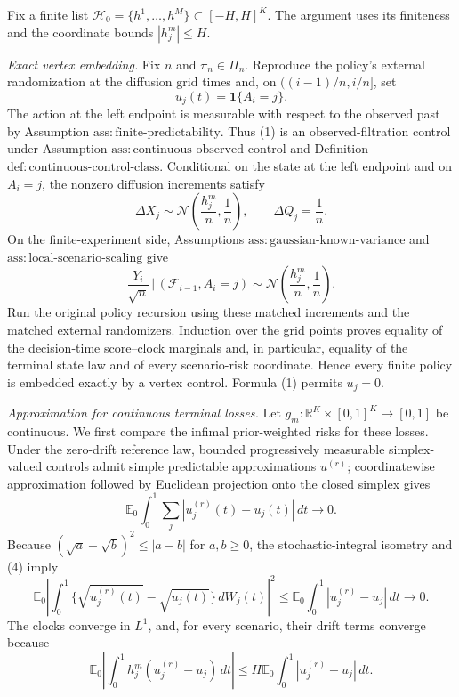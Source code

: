 Fix a finite list \(\mathcal H_0=\{h^1,\ldots,h^M\}\subset[-H,H]^K\).  The argument uses its finiteness and the coordinate bounds \(|h_j^m|\leq H\).

\emph{Exact vertex embedding.}  Fix \(n\) and \(\pi_n\in\Pi_n\).  Reproduce the policy's external randomization at the diffusion grid times and, on \(((i-1)/n,i/n]\), set
\[
 u_j(t)=\mathbf 1\{A_i=j\}.                                      \tag{1}
\]
The action at the left endpoint is measurable with respect to the observed past by Assumption \(\mathrm{ass{:}finite\text{-}predictability}\).  Thus (1) is an observed-filtration control under Assumption \(\mathrm{ass{:}continuous\text{-}observed\text{-}control}\) and Definition \(\mathrm{def{:}continuous\text{-}control\text{-}class}\).  Conditional on the state at the left endpoint and on \(A_i=j\), the nonzero diffusion increments satisfy
\[
 \Delta X_j\sim\mathcal N\!\left(\frac{h_j^m}{n},\frac1n\right),
 \qquad \Delta Q_j=\frac1n.                                      \tag{2}
\]
On the finite-experiment side, Assumptions \(\mathrm{ass{:}gaussian\text{-}known\text{-}variance}\) and \(\mathrm{ass{:}local\text{-}scenario\text{-}scaling}\) give
\[
 \frac{Y_i}{\sqrt n}\,\bigg|\,(\mathcal F_{i-1},A_i=j)
 \sim\mathcal N\!\left(\frac{h_j^m}{n},\frac1n\right).          \tag{3}
\]
Run the original policy recursion using these matched increments and the matched external randomizers.  Induction over the grid points proves equality of the decision-time score--clock marginals and, in particular, equality of the terminal state law and of every scenario-risk coordinate.  Hence every finite policy is embedded exactly by a vertex control.  Formula (1) permits \(u_j=0\).

\emph{Approximation for continuous terminal losses.}  Let \(g_m:\mathbb R^K\times[0,1]^K\to[0,1]\) be continuous.  We first compare the infimal prior-weighted risks for these losses.  Under the zero-drift reference law, bounded progressively measurable simplex-valued controls admit simple predictable approximations \(u^{(r)}\); coordinatewise approximation followed by Euclidean projection onto the closed simplex gives
\[
 \mathbb E_0\int_0^1\sum_j|u_j^{(r)}(t)-u_j(t)|\,dt\longrightarrow0. \tag{4}
\]
Because \((\sqrt a-\sqrt b)^2\leq|a-b|\) for \(a,b\geq0\), the stochastic-integral isometry and (4) imply
\[
 \mathbb E_0\left|\int_0^1
   \{\sqrt{u_j^{(r)}(t)}-\sqrt{u_j(t)}\}\,dW_j(t)\right|^2
 \leq \mathbb E_0\int_0^1|u_j^{(r)}-u_j|\,dt\longrightarrow0.    \tag{5}
\]
The clocks converge in \(L^1\), and, for every scenario, their drift terms converge because
\[
 \mathbb E_0\left|\int_0^1h_j^m(u_j^{(r)}-u_j)\,dt\right|
 \leq H\mathbb E_0\int_0^1|u_j^{(r)}-u_j|\,dt.                   \tag{6}
\]

